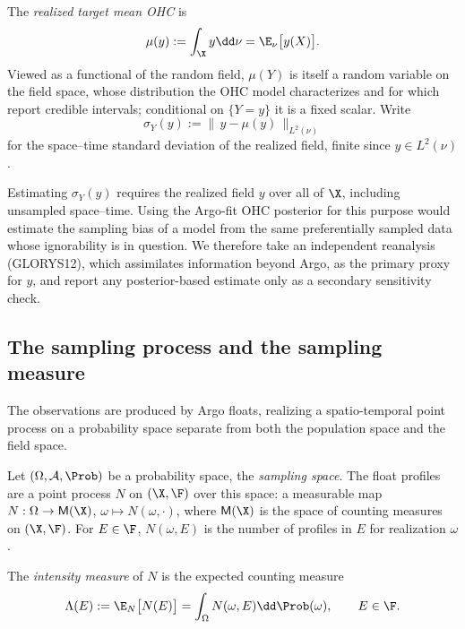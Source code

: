 \begin{definition}
\label{def:mu}
The \emph{realized target mean OHC} is
\[
  \mu(y) := \int_\X y \dd\nu = \E_\nu\big[y(X)\big].
\]
Viewed as a functional of the random field, $\mu(Y)$ is itself a random
variable on the field space, whose distribution the OHC model
characterizes and for which \citet{baugh2022} report credible
intervals; conditional on $\{Y=y\}$ it is a fixed scalar. Write
\[
  \sigma_Y(y) := \|\,y - \mu(y)\,\|_{L^2(\nu)}
\]
for the space--time standard deviation of the realized field, finite
since $y\in L^2(\nu)$.
\end{definition}

\begin{remark}
\label{rem:glorys}
Estimating $\sigma_Y(y)$ requires the realized field $y$ over all of
$\X$, including unsampled space--time. Using the Argo-fit OHC posterior
for this purpose would estimate the sampling bias of a model from the
same preferentially sampled data whose ignorability is in question. We
therefore take an independent reanalysis (GLORYS12), which assimilates
information beyond Argo, as the primary proxy for $y$, and report any
posterior-based estimate only as a secondary sensitivity check.
\end{remark}

\subsection{The sampling process and the sampling measure}
\label{sec:sampling}

The observations are produced by Argo floats, realizing a
spatio-temporal point process on a probability space separate from both
the population space and the field space.

\begin{definition}
\label{def:N}
Let $(\Omega,\mathcal{A},\Prob)$ be a probability space, the
\emph{sampling space}. The float profiles are a point process $N$ on
$(\X,\F)$ over this space: a measurable map $N:\Omega\to\mathsf{M}(\X)$,
$\omega\mapsto N(\omega,\cdot)$, where $\mathsf{M}(\X)$ is the space of
counting measures on $(\X,\F)$. For $E\in\F$, $N(\omega,E)$ is the
number of profiles in $E$ for realization $\omega$.
\end{definition}

\begin{definition}
\label{def:Lambda}
The \emph{intensity measure} of $N$ is the expected counting measure
\[
  \Lambda(E) := \E_N\big[N(E)\big] = \int_\Omega N(\omega,E)\dd\Prob(\omega),
  \qquad E \in \F .
\]
\end{definition}

